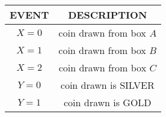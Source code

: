 \begin{tabular}{|c|c|}
\hline
 \textbf{EVENT} & \textbf{DESCRIPTION}\\
\hline
 $X = 0$ & coin drawn from box $A$ \\
\hline
 $X = 1$ & coin drawn from box $B$\\
\hline
 $X = 2$ & coin drawn from box $C$\\
\hline
 $Y = 0$ & coin drawn is SILVER\\
 \hline
 $Y = 1$ & coin drawn is GOLD\\
 \hline
\end{tabular}\\

